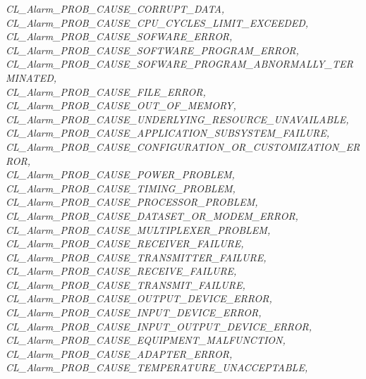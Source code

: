 \begin{flushleft}
\begin{tabbing}
\>\>\>\>\textit{CL\_Alarm\_PROB\_CAUSE\_CORRUPT\_DATA,}\\
\>\>\>\>\textit{CL\_Alarm\_PROB\_CAUSE\_CPU\_CYCLES\_LIMIT\_EXCEEDED,}\\
\>\>\>\>\textit{CL\_Alarm\_PROB\_CAUSE\_SOFWARE\_ERROR,}\\
\>\>\>\>\textit{CL\_Alarm\_PROB\_CAUSE\_SOFTWARE\_PROGRAM\_ERROR,}\\
\>\>\>\>\textit{CL\_Alarm\_PROB\_CAUSE\_SOFWARE\_PROGRAM\_ABNORMALLY\_TERMINATED,}\\
\>\>\>\>\textit{CL\_Alarm\_PROB\_CAUSE\_FILE\_ERROR,}\\
\>\>\>\>\textit{CL\_Alarm\_PROB\_CAUSE\_OUT\_OF\_MEMORY,}\\
\>\>\>\>\textit{CL\_Alarm\_PROB\_CAUSE\_UNDERLYING\_RESOURCE\_UNAVAILABLE,}\\
\>\>\>\>\textit{CL\_Alarm\_PROB\_CAUSE\_APPLICATION\_SUBSYSTEM\_FAILURE,}\\
\>\>\>\>\textit{CL\_Alarm\_PROB\_CAUSE\_CONFIGURATION\_OR\_CUSTOMIZATION\_ERROR,}\\
\>\>\>\>\textit{CL\_Alarm\_PROB\_CAUSE\_POWER\_PROBLEM,}\\
\>\>\>\>\textit{CL\_Alarm\_PROB\_CAUSE\_TIMING\_PROBLEM,}\\
\>\>\>\>\textit{CL\_Alarm\_PROB\_CAUSE\_PROCESSOR\_PROBLEM,}\\
\>\>\>\>\textit{CL\_Alarm\_PROB\_CAUSE\_DATASET\_OR\_MODEM\_ERROR,}\\
\>\>\>\>\textit{CL\_Alarm\_PROB\_CAUSE\_MULTIPLEXER\_PROBLEM,}\\
\>\>\>\>\textit{CL\_Alarm\_PROB\_CAUSE\_RECEIVER\_FAILURE,}\\
\>\>\>\>\textit{CL\_Alarm\_PROB\_CAUSE\_TRANSMITTER\_FAILURE,}\\
\>\>\>\>\textit{CL\_Alarm\_PROB\_CAUSE\_RECEIVE\_FAILURE,}\\
\>\>\>\>\textit{CL\_Alarm\_PROB\_CAUSE\_TRANSMIT\_FAILURE,}\\
\>\>\>\>\textit{CL\_Alarm\_PROB\_CAUSE\_OUTPUT\_DEVICE\_ERROR,}\\
\>\>\>\>\textit{CL\_Alarm\_PROB\_CAUSE\_INPUT\_DEVICE\_ERROR,}\\
\>\>\>\>\textit{CL\_Alarm\_PROB\_CAUSE\_INPUT\_OUTPUT\_DEVICE\_ERROR,}\\
\>\>\>\>\textit{CL\_Alarm\_PROB\_CAUSE\_EQUIPMENT\_MALFUNCTION,}\\
\>\>\>\>\textit{CL\_Alarm\_PROB\_CAUSE\_ADAPTER\_ERROR,}\\
\>\>\>\>\textit{CL\_Alarm\_PROB\_CAUSE\_TEMPERATURE\_UNACCEPTABLE,}\\

\end{tabbing}
\end{flushleft}
